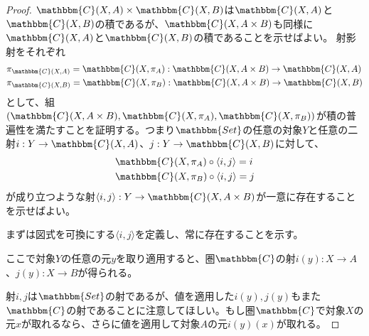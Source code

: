 \documentclass[uplatex,dvipdfmx]{jsarticle}
\newcommand{\cat}[1]{\mathbbm{#1}}
\newcommand{\arrow}{\rightarrow}
\newcommand{\tuple}[1]{\langle #1\rangle}
\newcommand{\mor}[3]{#1:#2\arrow #3}
\newcommand{\arset}[3]{\cat{#1}(#2,#3)}
\newtheorem{proof}{証明}[section]
\numberwithin{proof}{subsection}
\begin{document}
	\begin{proof}
		$\arset{C}{X}{A}\times\arset{C}{X}{B}$は$\arset{C}{X}{A}$と$\arset{C}{X}{B}$の積であるが、$\arset{C}{X}{A\times B}$も同様に$\arset{C}{X}{A}$と$\arset{C}{X}{B}$の積であることを示せばよい。
		射影射をそれぞれ
		\begin{align*}
			&\pi_{\arset{C}{X}{A}}=\mor{\arset{C}{X}{\pi_A}}{\arset{C}{X}{A\times B}}{\arset{C}{X}{A}}\\
			&\pi_{\arset{C}{X}{B}}=\mor{\arset{C}{X}{\pi_B}}{\arset{C}{X}{A\times B}}{\arset{C}{X}{B}}
		\end{align*}
		として、組$(\arset{C}{X}{A\times B},\arset{C}{X}{\pi_A},\arset{C}{X}{\pi_B})$が積の普遍性を満たすことを証明する。つまり$\cat{Set}$の任意の対象$Y$と任意の二射$\mor{i}{Y}{\arset{C}{X}{A}}$、$\mor{j}{Y}{\arset{C}{X}{B}}$に対して、
		\begin{align*}
			&\arset{C}{X}{\pi_A}\circ\tuple{i,j}=i\\
			&\arset{C}{X}{\pi_B}\circ\tuple{i,j}=j
		\end{align*}
		が成り立つような射$\mor{\tuple{i,j}}{Y}{\arset{C}{X}{A\times B}}$が一意に存在することを示せばよい。

		まずは図式を可換にする$\tuple{i,j}$を定義し、常に存在することを示す。
		\begin{center}
		\end{center}
		ここで対象$Y$の任意の元$y$を取り適用すると、圏$\cat{C}$の射$\mor{i(y)}{X}{A}$、$\mor{j(y)}{X}{B}$が得られる。

		射$i,j$は$\cat{Set}$の射であるが、値を適用した$i(y),j(y)$もまた$\cat{C}$の射であることに注意してほしい。もし圏$\cat{C}$で対象$X$の元$x$が取れるなら、さらに値を適用して対象$A$の元$i(y)(x)$が取れる。


\end{proof}
\end{document}
